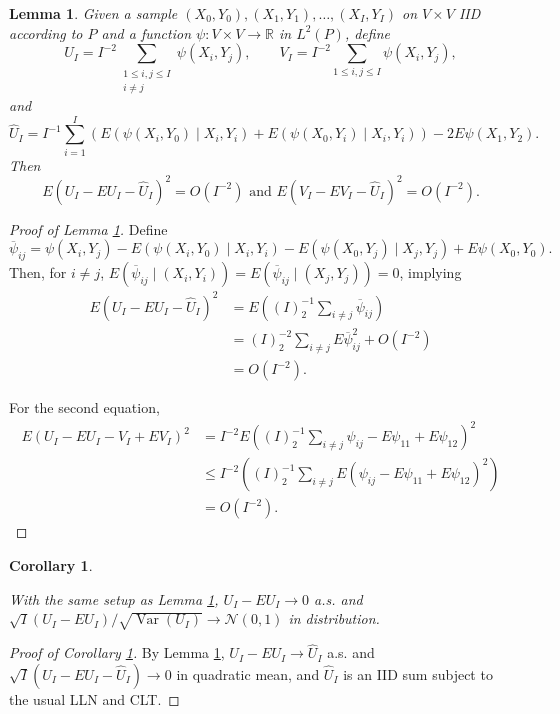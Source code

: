 \documentclass[12pt]{article}
\DeclareMathOperator{\V}{Var}
\newcommand{\I}{I}
\newcommand{\E}{E}
\renewcommand{\P}{P}
\newcommand{\Kernel}{\psi}
\newcommand{\seqspace}{V}%
\newtheorem{lemma}[theorem]{Lemma}
\newtheorem{corollary}[theorem]{Corollary}
\newcommand{\comment}[1]{
  \iftoggle{commenttoggle}{
    {\normalsize{\color{red}{ #1}}\normalsize}
  }
  {}
}
\begin{document}
    \begin{lemma}\label{lemma:hajek} Given a sample $(X_0,Y_0),(X_1,Y_1),\ldots,(X_\I,Y_\I)$ on
    $\seqspace\times\seqspace$ IID according to $\P$ and a
    function $\Kernel: \seqspace\times\seqspace \to \mathbb{R}$ in $L^2(\P)$, define
    $$
    U_\I = \I^{-2}\sum_{\substack{1\le i,j\le\I\\i\neq j}}\Kernel(X_i,Y_j),\qquad
    V_\I = \I^{-2}\sum_{1\le i,j\le\I}\Kernel(X_i,Y_j),
    $$
    and
    $$
    \hat{U}_\I = \I^{-1}\sum_{i=1}^\I\left(\E(\Kernel(X_i,Y_0)\mid X_i,Y_i) + \E(\Kernel(X_0,Y_i)\mid X_i,Y_i)\right) - 2\E\Kernel(X_1,Y_2).
    $$
    Then
    $$
    \E(U_\I-\E U_\I-\hat{U}_\I)^2=O(\I^{-2})\text{ and }  \E(V_\I-\E V_\I-\hat{U}_\I)^2=O(\I^{-2}).
    $$
  \end{lemma}

  \begin{proof}[Proof of Lemma \ref{lemma:hajek}]

    Define
    $$
    \overline\Kernel_{ij}=\Kernel(X_i,Y_j) - \E(\Kernel(X_i,Y_0)\mid X_i,Y_i) - \E(\Kernel(X_0,Y_j)\mid X_j,Y_j) + \E\Kernel(X_0,Y_0).
    $$
    Then, for $i\neq j$, $\E (\overline\Kernel_{ij}\mid (X_i,Y_i))=\E (\overline\Kernel_{ij}\mid (X_j,Y_j))=0$, implying 
    \begin{align}
      \E(U_\I-\E U_\I - \hat{U}_\I)^2 &= \E\left((\I)^{-1}_2\sum_{i\neq j} \overline\Kernel_{ij}\right)\\
                                      &= (\I)_2^{-2}\sum_{i\neq j}\E \overline\Kernel_{ij}^2 + O(\I^{-2})\\
                                      &=O(\I^{-2}).
    \end{align}

    For the second equation,
    \begin{align}
      \E(U_\I-\E U_\I - V_\I+\E V_\I)^2 &=  \I^{-2}\E\left((\I)_2^{-1}\sum_{i\neq j}\Kernel_{ij} - \E \Kernel_{11}+\E\Kernel_{12}\right)^2\\
                                        &\le \I^{-2}\left((\I)_2^{-1}\sum_{i\neq j}\E(\Kernel_{ij}-\E\Kernel_{11}+\E\Kernel_{12})^2\right)\\
      &=O(\I^{-2}).
    \end{align}
    
  \end{proof}
  
  \begin{corollary}\label{corollary:convergence}
    
    With the same setup as Lemma \ref{lemma:hajek}, $U_\I-\E U_\I\to 0$ a.s. and $\sqrt{\I}(U_\I-\E U_\I)/\sqrt{\V(U_\I)}\to\mathcal{N}(0,1)$ in distribution.%
  \end{corollary}
  \begin{proof}[Proof of Corollary \ref{corollary:convergence}]
    By Lemma \ref{lemma:hajek}, $U_\I-\E U_\I\to\hat{U}_\I$ a.s. and $\sqrt{\I}(U_\I- \E U_\I-\hat{U}_\I)\to 0$ in quadratic mean, and $\hat{U}_\I$ is an IID sum subject to the usual LLN and CLT.
  \end{proof}
\end{document}
